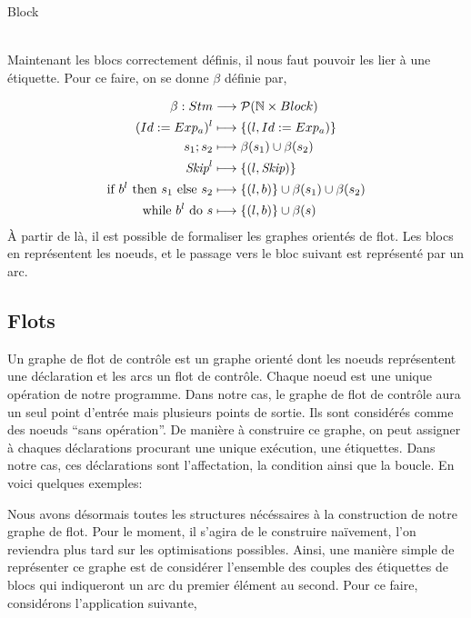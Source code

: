 \documentclass[a4paper, 12pt]{article}
\begin{document}
\begin{dtype}{Block}
	\\
	\\
	\akind{\sskip}
\end{dtype}
Maintenant les blocs correctement définis, il nous faut pouvoir les lier à une étiquette. Pour ce faire, on se donne $\beta$ définie par,

\begin{align*}
	\beta : Stm &\longrightarrow \mathcal{P}(\mathbb{N} \times Block)\\
	({Id}\space:=\space{Exp_a})^l&\longmapsto\{(l, Id := Exp_a)\}\\
	{s_1}\space;\space{s_2} &\longmapsto \beta(s_1) \cup \beta(s_2)\\
	\textit{Skip}^l &\longmapsto \{(l, \textit{Skip})\}\\
	\text{if }{b^l}\text{ then }{s_1}\text{ else }{s_2} &\longmapsto \{(l, b)\}\cup \beta(s_1)\cup\beta(s_2)\\
	\text{while }{b^l}\text{ do }{s} &\longmapsto \{(l, b)\}\cup\beta(s)
\end{align*}
À partir de là, il est possible de formaliser les graphes orientés de flot. Les blocs en représentent les noeuds, et le passage 
vers le bloc suivant est représenté par un arc.

\subsection{Flots}
Un graphe de flot de contrôle est un graphe orienté dont les noeuds représentent une déclaration et les arcs un
flot de contrôle. Chaque noeud est une unique opération de notre programme. Dans notre cas, le graphe de flot de
contrôle aura un seul point d'entrée mais plusieurs points de sortie. Ils sont considérés comme des noeuds ``sans opération''.
De manière à construire ce graphe, on peut assigner à chaques déclarations procurant une unique exécution, une étiquettes.
Dans notre cas, ces déclarations sont l'affectation, la condition ainsi que la boucle. En voici quelques exemples:

\begin{center}\end{center}
Nous avons désormais toutes les structures nécéssaires à la construction de notre graphe de flot. Pour le moment, il s'agira de 
le construire naïvement, l'on reviendra plus tard sur les optimisations possibles. Ainsi, une manière simple de représenter ce 
graphe est de considérer l'ensemble des couples des étiquettes de blocs qui indiqueront un arc du premier élément au second. 
Pour ce faire, considérons l'application suivante, 
\end{document}
